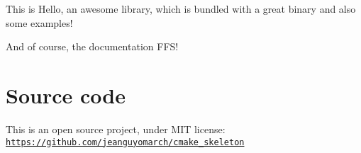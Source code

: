 This is Hello, an awesome library, which is bundled with a great binary and also some examples!

And of course, the documentation F\-F\-S!

\hypertarget{index_s_source}{}\section{Source code}\label{index_s_source}
This is an open source project, under M\-I\-T license\-: \href{https://github.com/jeanguyomarch/cmake_skeleton}{\tt https\-://github.\-com/jeanguyomarch/cmake\-\_\-skeleton} 